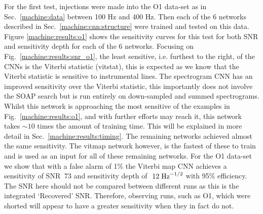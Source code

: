 For the first test, injections were made into the O1 data-set as in Sec.~\ref{machine:data} between 100 Hz and 400 Hz. Then each of the 6 networks described in Sec.~\ref{machine:cnn:structure} were trained and tested on this data. 
Figure \ref{machine:results:o1} shows the sensitivity curves for this test for both \gls{SNR} and sensitivity depth for each of the 6 networks. Focusing on Fig.~\ref{machine:results:snr_o1}, the least sensitive, i.e. furthest to the right, of the \glspl{CNN} is the Viterbi statistic (vitstat), this is expected as we know that the Viterbi statistic is sensitive to instrumental lines. 
The spectrogram \gls{CNN} has an improved sensitivity over the Viterbi statistic, this importantly does not involve the SOAP search but is run entirely on down-sampled and summed spectrograms. 
Whilst this network is approaching the most sensitive of the examples in Fig.~\ref{machine:results:o1}, and with further efforts may reach it, this network takes $\sim10$ times the amount of training time. This will be explained in more detail in Sec.~\ref{machine:results:timing}.
The remaining networks achieved almost the same sensitivity. 
The vitmap network however, is the fastest of these to train and is used as an input for all of these remaining networks.
For the O1 data-set we show that with a false alarm of 1\% the Viterbi map \gls{CNN} achieves a sensitivity of SNR $~73$ and sensitivity depth of $~12\; {\rm Hz}^{-1/2}$ with 95\% efficiency.
The \gls{SNR} here should not be compared between different runs as this is the integrated `Recovered' \gls{SNR}. Therefore, observing runs, such as O1, which were shorted will appear to have a greater sensitivity when they in fact do not. 


